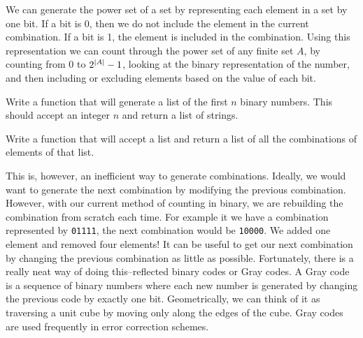 We can generate the power set of a set by representing each element in a set by one bit.
If a bit is 0, then we do not include the element in the current combination.  If a
bit is 1, the element is included in the combination.
Using this representation we can count through the power set of any finite set $A$, by counting from 0 to $2^{\left\lvert A\right\rvert}-1$, looking at the binary representation of the number, and then including or excluding elements based on the value of each bit.

\begin{problem}
Write a function that will generate a list of the first $n$ binary numbers.  This should accept an integer $n$ and return a list of strings.
\end{problem}

\begin{problem}
Write a function that will accept a list and return a list of all the combinations
of elements of that list.
\end{problem}

This is, however, an inefficient way to generate combinations.  Ideally, we would want
to generate the next combination by modifying the previous combination.  However, with
our current method of counting in binary, we are rebuilding the combination from scratch
each time.  For example it we have a combination represented by \texttt{01111}, the next
combination would be \texttt{10000}.  We added one element and removed four elements!
It can be useful to get our next combination by changing the previous combination as little as possible.
Fortunately, there is a really neat way of doing this--reflected binary codes or Gray codes. 
A Gray code is a sequence of binary numbers where each new number is generated by
changing the previous code by exactly one bit.  Geometrically, we can think of it as
traversing a unit cube by moving only along the edges of the cube.
Gray codes are used frequently in error correction schemes.

